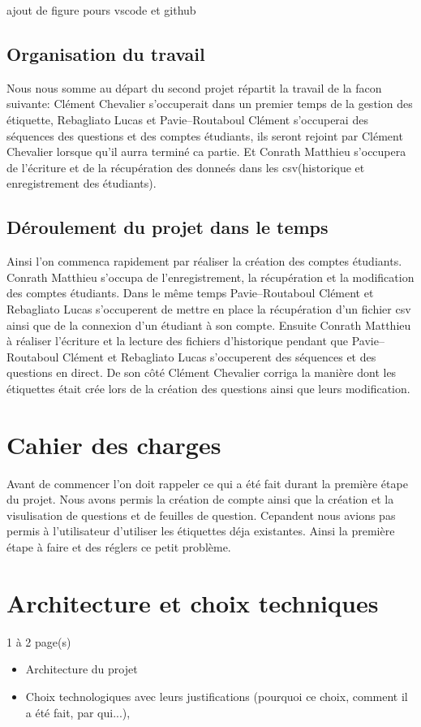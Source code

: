 \documentclass[a4paper, 12pt]{article}
\begin{document}
ajout de figure pours vscode et github
\subsection{Organisation du travail}
Nous nous somme au départ du second projet répartit la travail de la facon 
suivante: Clément Chevalier s'occuperait dans un premier temps de la gestion
des étiquette,
Rebagliato Lucas et Pavie--Routaboul Clément s'occuperai des séquences des 
questions et des comptes étudiants, ils seront rejoint par Clément Chevalier
lorsque qu'il
aurra terminé ca partie. Et Conrath Matthieu s'occupera de l'écriture et de la
récupération des donneés dans les csv(historique et enregistrement des 
étudiants).
\subsection{Déroulement du projet dans le temps}
Ainsi l'on commenca rapidement par réaliser la création des comptes étudiants.
Conrath Matthieu s'occupa de l'enregistrement, la récupération et la 
modification des
comptes étudiants. Dans le même temps Pavie--Routaboul Clément et Rebagliato
Lucas s'occuperent de mettre en place la récupération d'un fichier csv ainsi
que de la
connexion d'un étudiant à son compte. Ensuite Conrath Matthieu à réaliser 
l'écriture et la lecture des fichiers d'historique pendant que Pavie--Routaboul
Clément et
Rebagliato Lucas s'occuperent des séquences et des questions en direct. De son 
côté Clément Chevalier corriga la manière dont les étiquettes était crée lors
de la création des questions ainsi que leurs modification.

\section{Cahier des charges}

Avant de commencer l'on doit rappeler ce qui a été fait durant la première étape
du projet. Nous avons permis la création de compte ainsi que la création et la
visulisation de questions et de feuilles de question. Cepandent nous avions pas
permis à l'utilisateur d'utiliser les étiquettes déja existantes. Ainsi la 
première
étape à faire et des réglers ce petit problème.

\section{Architecture et choix techniques}

1 à 2 page(s) 
\begin{itemize}
\item Architecture du projet
\item Choix technologiques  avec leurs justifications (pourquoi ce choix, 
comment il a été fait, par qui...),
\end{itemize}
\end{document}
